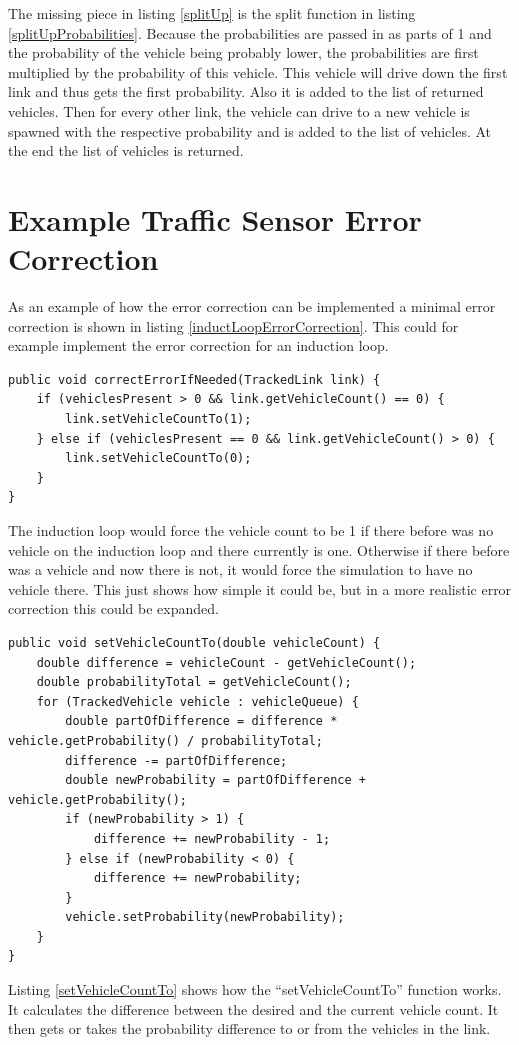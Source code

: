 The missing piece in listing \ref{splitUp} is the split function in listing \ref{splitUpProbabilities}. Because the probabilities are passed in as parts of 1 and the probability of the vehicle being probably lower, the probabilities are first multiplied by the probability of this vehicle. This vehicle will drive down the first link and thus gets the first probability. Also it is added to the list of returned vehicles. Then for every other link, the vehicle can drive to a new vehicle is spawned with the respective probability and is added to the list of vehicles. At the end the list of vehicles is returned.

\section{Example Traffic Sensor Error Correction}

As an example of how the error correction can be implemented a minimal error correction is shown in listing \ref{inductLoopErrorCorrection}. This could for example implement the error correction for an induction loop.

\vspace{0.5em}

\begin{lstlisting}[caption={Induction Loop Error Correction}, label=inductLoopErrorCorrection]
public void correctErrorIfNeeded(TrackedLink link) {
	if (vehiclesPresent > 0 && link.getVehicleCount() == 0) {
		link.setVehicleCountTo(1);
	} else if (vehiclesPresent == 0 && link.getVehicleCount() > 0) {
		link.setVehicleCountTo(0);
	}
}
\end{lstlisting}

The induction loop would force the vehicle count to be 1 if there before was no vehicle on the induction loop and there currently is one. Otherwise if there before was a vehicle and now there is not, it would force the simulation to have no vehicle there. This just shows how simple it could be, but in a more realistic error correction this could be expanded.

\vspace{0.5em}

\begin{lstlisting}[caption={Set Vehicle Count Function of TrackedLink}, label=setVehicleCountTo]
public void setVehicleCountTo(double vehicleCount) {
	double difference = vehicleCount - getVehicleCount();
	double probabilityTotal = getVehicleCount();
	for (TrackedVehicle vehicle : vehicleQueue) {
		double partOfDifference = difference * vehicle.getProbability() / probabilityTotal;
		difference -= partOfDifference;
		double newProbability = partOfDifference + vehicle.getProbability();
		if (newProbability > 1) {
			difference += newProbability - 1;
		} else if (newProbability < 0) {
			difference += newProbability;
		}
		vehicle.setProbability(newProbability);
	}
}
\end{lstlisting}

Listing \ref{setVehicleCountTo} shows how the ``setVehicleCountTo'' function works. It calculates the difference between the desired and the current vehicle count. It then gets or takes the probability difference to or from the vehicles in the link.